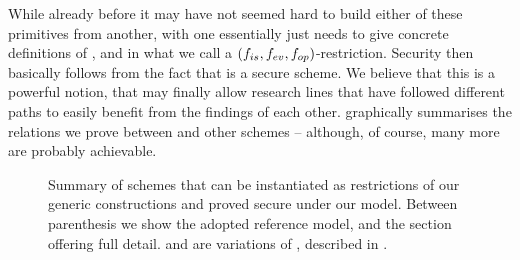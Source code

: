 While already before \UAS it may have not seemed hard to build either of these
primitives from another, with \UAS one essentially just needs to give concrete
definitions of \fissue, \feval and \finsp in what we call a $(f_{is},f_{ev},
f_{op})$-\CUASGen restriction. Security then basically follows from
the fact that \CUASGen is a secure \UAS scheme. We believe that this is a
powerful notion, that may finally allow research lines that have
followed different paths to easily benefit from the findings of each other.
 graphically summarises the relations we prove between
\UAS and other schemes -- although, of course, many more are probably
achievable.

\begin{figure}[ht!]
  \centering
  \scalebox{0.85}{
    
  }
  \caption{Summary of schemes that can be instantiated as restrictions of our
    generic constructions and proved secure under our \UAS model. Between
    parenthesis we show the adopted reference model, and the section offering
    full detail. \CUASGenInt and \CUASGenHideIss are variations of \CUASGen,
    described in .}
  \label{fig:relations}
\end{figure}



